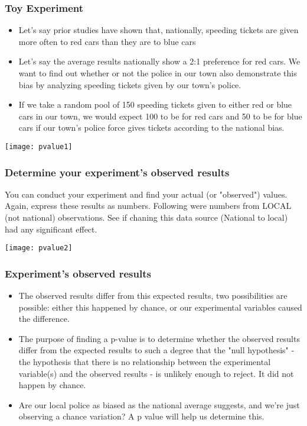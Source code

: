 \begin{frame}
\frametitle{Toy Experiment}

\begin{itemize}
\item Let's say prior studies have shown that, nationally, speeding tickets are given more often to red cars than they are to blue cars
\item Let's say the average results nationally show a 2:1 preference for red cars. We want to find out whether or not the police in our town also demonstrate this bias by analyzing speeding tickets given by our town's police. 
\item If we take a random pool of 150 speeding tickets given to either red or blue cars in our town, we would expect 100 to be for red cars and 50 to be for blue cars if our town's police force gives tickets according to the national bias.
\end{itemize}

\begin{center}
\texttt{[image: pvalue1]}
\end{center}
\end{frame}


\begin{frame}
\frametitle{Determine your experiment's observed results}
You can conduct your experiment and find your actual (or "observed") values. Again, express these results as numbers. Following were numbers from LOCAL (not national) observations. See if chaning this data source (National to local) had any significant effect.

\begin{center}
\texttt{[image: pvalue2]}
\end{center}
\end{frame}

\begin{frame}
\frametitle{Experiment's observed results}
\begin{itemize}
\item The observed results differ from this expected results, two possibilities are possible: either this happened by chance, or our experimental variables caused the difference. 
\item The purpose of finding a p-value is to determine whether the observed results differ from the expected results to such a degree that the "null hypothesis" - the hypothesis that there is no relationship between the experimental variable(s) and the observed results - is unlikely enough to reject. It did not happen by chance.
\item Are our local police as biased as the national average suggests, and we're just observing a chance variation? A p value will help us determine this.

\end{itemize}

\end{frame}

